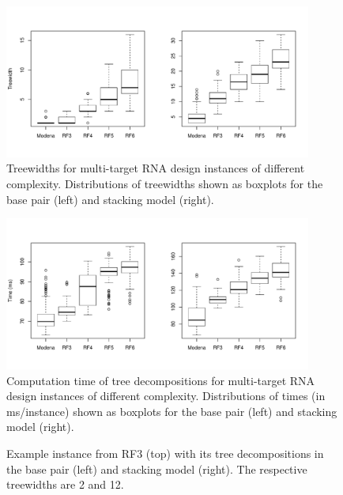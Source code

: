 \documentclass{bioinfo}
\makeatletter
\newlength{\@aligneps}
\newcommand{\includegraphicstop}[2][]{%
\sbox{\@alignepsbox}{\texttt{[image: \#2]}}%
\setlength{\@aligneps}{-\ht\@alignepsbox}%
\addtolength{\@aligneps}{2ex}%
\raisebox{\@aligneps}{\usebox{\@alignepsbox}}}
\makeatother
\begin{document}
\begin{figure}
  \centering\includegraphics[width=0.9\textwidth]{Figs/td-widths}
  \caption{Treewidths for multi-target RNA design instances of
    different complexity. Distributions of treewidths shown as boxplots for the base pair (left) and stacking model (right).}
  \label{fig:td-widths}
\end{figure}

\begin{figure}
  \centering
  \includegraphics[width=0.9\textwidth]{Figs/td-times}
  \caption{Computation time of tree decompositions for
    multi-target RNA design instances of different complexity.
    Distributions of times (in ms/instance) shown as boxplots for the base pair (left) and stacking model (right).}
  \label{fig:td-times}
\end{figure}


\begin{figure}[t!]
  \centering
  
  \includegraphicstop[width=0.6\textwidth]{Figs/td-example-basepair}%
  \includegraphicstop[width=0.35\textwidth]{Figs/td-example-stacking}
  \caption{Example instance from RF3 (top) with its tree decompositions in the base pair (left) and stacking model (right). The respective treewidths are 2 and 12.}
  \label{fig:td-example}
\end{figure}
\end{document}
